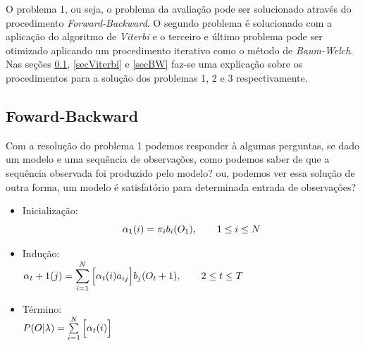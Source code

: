 O problema 1, ou seja, o problema da avaliação pode ser solucionado através do procedimento \textit{Forward-Backward}. O segundo problema é solucionado com a aplicação do algoritmo de \textit{Viterbi} e o terceiro e último problema pode ser otimizado aplicando um procedimento iterativo como o método de \textit{Baum-Welch}. Nas seções \ref{secFB}, \ref{secViterbi} e \ref{secBW} faz-se uma explicação sobre os procedimentos para a solução dos problemas 1, 2 e 3 respectivamente.

\subsection{Foward-Backward}
\label{secFB}
Com a resolução do problema 1 podemos responder à algumas perguntas, se dado um modelo e uma sequência de observações, como podemos  saber de que a sequência observada foi produzido pelo modelo? ou, podemos ver essa  solução de outra forma,  um modelo é satisfatório para determinada entrada de observações?
 \begin{itemize}
\item Inicialização:\\
\begin{equation}
\displaystyle  \alpha_1 (i) = \pi_i b_i (O_1), \qquad 1 \leq i \leq N \\
\end{equation}

\item Indução:\\
$
\displaystyle \alpha_t + 1 (j) = \sum\limits_{ i = 1}^{N} \Big[\alpha_t(i) a_{ij} \Big]b_j (O_t + 1), \qquad 2 \leq t \leq T\\
$

\item Término:\\
$
P(O| \lambda) =  \sum\limits_{ i = 1}^{N} \Big[\alpha_t(i) \Big]\\
$

\end{itemize}

